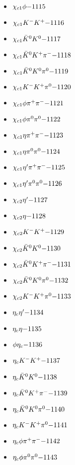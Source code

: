\begin{multicols}{3}
\begin{itemize}
 \item $ \chi_{c1} \phi \hfill{-1115}$
 \item $ \chi_{c1} K^{-} K^{+} \hfill{-1116}$
 \item $ \chi_{c1} \bar{K}^{0} K^{0} \hfill{-1117}$
 \item $ \chi_{c1} \bar{K}^{0} K^{+} \pi^{-} \hfill{-1118}$
 \item $ \chi_{c1} \bar{K}^{0} K^{0} \pi^{0} \hfill{-1119}$
 \item $ \chi_{c1} K^{-} K^{+} \pi^{0} \hfill{-1120}$
 \item $ \chi_{c1} \phi \pi^{+} \pi^{-} \hfill{-1121}$
 \item $ \chi_{c1} \phi \pi^{0} \pi^{0} \hfill{-1122}$
 \item $ \chi_{c1} \eta \pi^{+} \pi^{-} \hfill{-1123}$
 \item $ \chi_{c1} \eta \pi^{0} \pi^{0} \hfill{-1124}$
 \item $ \chi_{c1} {\eta^{\prime}} \pi^{+} \pi^{-} \hfill{-1125}$
 \item $ \chi_{c1} {\eta^{\prime}} \pi^{0} \pi^{0} \hfill{-1126}$
 \item $ \chi_{c2} {\eta^{\prime}} \hfill{-1127}$
 \item $ \chi_{c2} \eta \hfill{-1128}$
 \item $ \chi_{c2} K^{-} K^{+} \hfill{-1129}$
 \item $ \chi_{c2} \bar{K}^{0} K^{0} \hfill{-1130}$
 \item $ \chi_{c2} \bar{K}^{0} K^{+} \pi^{-} \hfill{-1131}$
 \item $ \chi_{c2} \bar{K}^{0} K^{0} \pi^{0} \hfill{-1132}$
 \item $ \chi_{c2} K^{-} K^{+} \pi^{0} \hfill{-1133}$
 \item $ \eta_{c} {\eta^{\prime}} \hfill{-1134}$
 \item $ \eta_{c} \eta \hfill{-1135}$
 \item $ \phi \eta_{c} \hfill{-1136}$
 \item $ \eta_{c} K^{-} K^{+} \hfill{-1137}$
 \item $ \eta_{c} \bar{K}^{0} K^{0} \hfill{-1138}$
 \item $ \eta_{c} \bar{K}^{0} K^{+} \pi^{-} \hfill{-1139}$
 \item $ \eta_{c} \bar{K}^{0} K^{0} \pi^{0} \hfill{-1140}$
 \item $ \eta_{c} K^{-} K^{+} \pi^{0} \hfill{-1141}$
 \item $ \eta_{c} \phi \pi^{+} \pi^{-} \hfill{-1142}$
 \item $ \eta_{c} \phi \pi^{0} \pi^{0} \hfill{-1143}$

\end{itemize}
\end{multicols}
